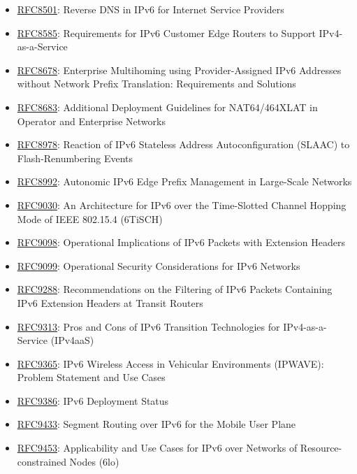 \documentclass[
]{article}
\begin{document}
\begin{itemize}
\item
  \href{https://www.rfc-editor.org/info/rfc8501}{RFC8501}: Reverse DNS
  in IPv6 for Internet Service Providers
\item
  \href{https://www.rfc-editor.org/info/rfc8585}{RFC8585}: Requirements
  for IPv6 Customer Edge Routers to Support IPv4-as-a-Service
\item
  \href{https://www.rfc-editor.org/info/rfc8678}{RFC8678}: Enterprise
  Multihoming using Provider-Assigned IPv6 Addresses without Network
  Prefix Translation: Requirements and Solutions
\item
  \href{https://www.rfc-editor.org/info/rfc8683}{RFC8683}: Additional
  Deployment Guidelines for NAT64/464XLAT in Operator and Enterprise
  Networks
\item
  \href{https://www.rfc-editor.org/info/rfc8978}{RFC8978}: Reaction of
  IPv6 Stateless Address Autoconfiguration (SLAAC) to Flash-Renumbering
  Events
\item
  \href{https://www.rfc-editor.org/info/rfc8992}{RFC8992}: Autonomic
  IPv6 Edge Prefix Management in Large-Scale Networks
\item
  \href{https://www.rfc-editor.org/info/rfc9030}{RFC9030}: An
  Architecture for IPv6 over the Time-Slotted Channel Hopping Mode of
  IEEE 802.15.4 (6TiSCH)
\item
  \href{https://www.rfc-editor.org/info/rfc9098}{RFC9098}: Operational
  Implications of IPv6 Packets with Extension Headers
\item
  \href{https://www.rfc-editor.org/info/rfc9099}{RFC9099}: Operational
  Security Considerations for IPv6 Networks
\item
  \href{https://www.rfc-editor.org/info/rfc9288}{RFC9288}:
  Recommendations on the Filtering of IPv6 Packets Containing IPv6
  Extension Headers at Transit Routers
\item
  \href{https://www.rfc-editor.org/info/rfc9313}{RFC9313}: Pros and Cons
  of IPv6 Transition Technologies for IPv4-as-a-Service (IPv4aaS)
\item
  \href{https://www.rfc-editor.org/info/rfc9365}{RFC9365}: IPv6 Wireless
  Access in Vehicular Environments (IPWAVE): Problem Statement and Use
  Cases
\item
  \href{https://www.rfc-editor.org/info/rfc9386}{RFC9386}: IPv6
  Deployment Status
\item
  \href{https://www.rfc-editor.org/info/rfc9433}{RFC9433}: Segment
  Routing over IPv6 for the Mobile User Plane
\item
  \href{https://www.rfc-editor.org/info/rfc9453}{RFC9453}: Applicability
  and Use Cases for IPv6 over Networks of Resource-constrained Nodes
  (6lo)
\end{itemize}
\end{document}
